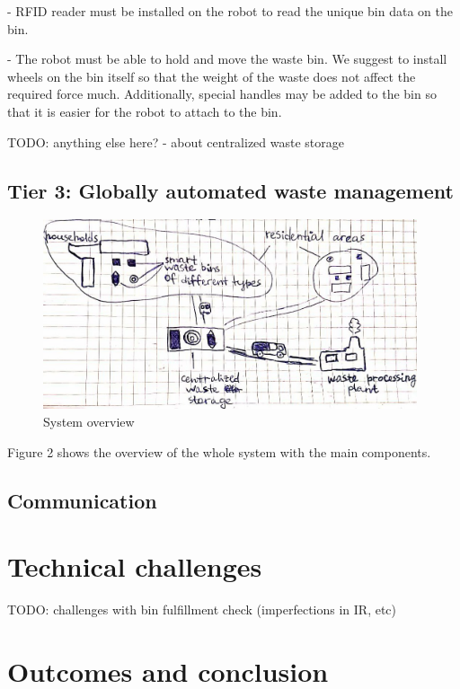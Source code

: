 \documentclass{article}
\begin{document}
- RFID reader must be installed on the robot to read the unique bin data on the bin.

- The robot must be able to hold and move the waste bin. We suggest to install wheels on the bin
itself so that the weight of the waste does not affect the required force much. Additionally,
special handles may be added to the bin so that it is easier for the robot to attach to the bin.

TODO: anything else here? - about centralized waste storage

\subsection{Tier 3: Globally automated waste management}

\begin{figure}[ht!]
\centering
\includegraphics[width=110mm]{./high_level_scheme.jpg}
\caption{System overview \label{overflow}}
\end{figure}

Figure 2 shows the overview of the whole system with the main components.

\subsection{Communication}


\section{Technical challenges}
TODO: challenges with bin fulfillment check (imperfections in IR, etc)

\section{Outcomes and conclusion}
\end{document}
